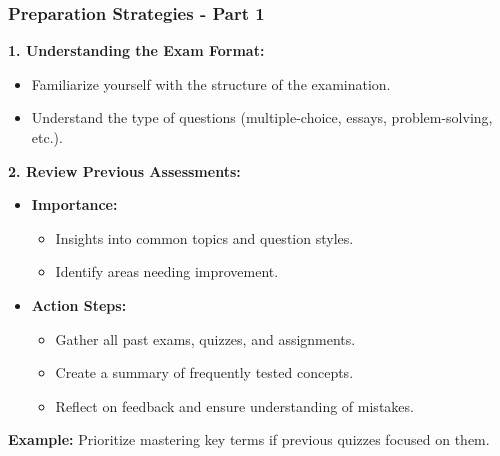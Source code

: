 \documentclass[aspectratio=169]{beamer}
\begin{document}
\begin{frame}[fragile]
    \frametitle{Preparation Strategies - Part 1}
    \textbf{1. Understanding the Exam Format:}
    \begin{itemize}
        \item Familiarize yourself with the structure of the examination.
        \item Understand the type of questions (multiple-choice, essays, problem-solving, etc.).
    \end{itemize}

    \textbf{2. Review Previous Assessments:}
    \begin{itemize}
        \item \textbf{Importance:}
        \begin{itemize}
            \item Insights into common topics and question styles.
            \item Identify areas needing improvement.
        \end{itemize}
        \item \textbf{Action Steps:}
        \begin{itemize}
            \item Gather all past exams, quizzes, and assignments.
            \item Create a summary of frequently tested concepts.
            \item Reflect on feedback and ensure understanding of mistakes.
        \end{itemize}
    \end{itemize}

    \textbf{Example:} Prioritize mastering key terms if previous quizzes focused on them.
\end{frame}
\end{document}
